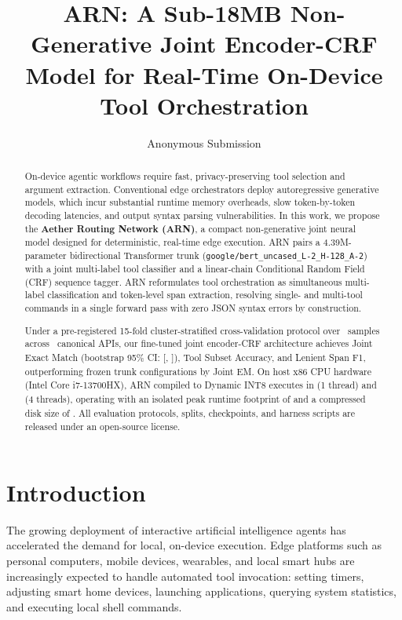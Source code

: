 \documentclass[letterpaper]{article}
\title{ARN: A Sub-18MB Non-Generative Joint Encoder-CRF Model for Real-Time On-Device Tool Orchestration}
\author{
    Anonymous Submission
}
\begin{document}
\maketitle

\begin{abstract}
On-device agentic workflows require fast, privacy-preserving tool selection and argument extraction. Conventional edge orchestrators deploy autoregressive generative models, which incur substantial runtime memory overheads, slow token-by-token decoding latencies, and output syntax parsing vulnerabilities. In this work, we propose the \textbf{Aether Routing Network (ARN)}, a compact non-generative joint neural model designed for deterministic, real-time edge execution. ARN pairs a 4.39M-parameter bidirectional Transformer trunk (\texttt{google/bert\_uncased\_L-2\_H-128\_A-2}) with a joint multi-label tool classifier and a linear-chain Conditional Random Field (CRF) sequence tagger. ARN reformulates tool orchestration as simultaneous multi-label classification and token-level span extraction, resolving single- and multi-tool commands in a single forward pass with zero JSON syntax errors by construction. 

Under a pre-registered 15-fold cluster-stratified cross-validation protocol over \TotalDatasetSamples\ samples across \TotalCandidateTools\ canonical APIs, our fine-tuned joint encoder-CRF architecture achieves \textbf{\PrimaryJointEM} Joint Exact Match (bootstrap 95\% CI: [\PrimaryJointEMCILow, \PrimaryJointEMCIHigh]), \textbf{\PrimaryToolAcc} Tool Subset Accuracy, and \textbf{\PrimaryLenientFOne} Lenient Span F1, outperforming frozen trunk configurations by \textbf{\FineTuningJointEMDelta} Joint EM. On host x86 CPU hardware (Intel Core i7-13700HX), ARN compiled to Dynamic INT8 executes in \textbf{\ONNXINTOnetTLatencyMean} (1 thread) and \textbf{\ONNXINTFourTLatencyMean} (4 threads), operating with an isolated peak runtime footprint of \textbf{\IsolatedPeakRSS} and a compressed disk size of \textbf{\ModelSizeONNXINT}. All evaluation protocols, splits, checkpoints, and harness scripts are released under an open-source license.
\end{abstract}

\section{Introduction}

The growing deployment of interactive artificial intelligence agents has accelerated the demand for local, on-device execution. Edge platforms such as personal computers, mobile devices, wearables, and local smart hubs are increasingly expected to handle automated tool invocation: setting timers, adjusting smart home devices, launching applications, querying system statistics, and executing local shell commands.
\end{document}

